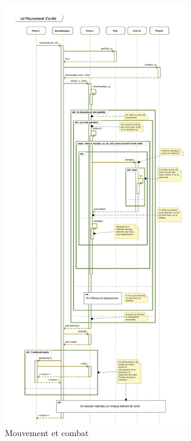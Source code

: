 \begin{figure}[h!]
    \centering
    \includegraphics[width=0.7\textwidth]{res/MouvementUnite.png}
    \caption{Mouvement et combat}
    \label{fig:movement}
\end{figure}

